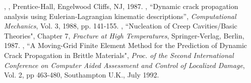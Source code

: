 \documentclass[12pt]{ksiamproc}
\begin{document}
	\begin{thebibliography}{11}
		,
		, Prentice-Hall, Engelwood Cliffs, NJ, 1987.
		,
		{``Dynamic crack propagation analysis using Eulerian-Lagrangian
			kinematic descriptions''}, {\em Computational Mechanics}, Vol. 3,
		1988, pp. 141-155.
		,
		{``Nucleation of Creep Cavities/Basic Theories"},  Chapter 7, {\it
			Fracture at High Temperatures}, Springer-Verlag, Berlin, 1987.
		,
		{``A Moving-Grid Finite Element Method for the Prediction of
			Dynamic Crack Propagation in Brittle Materials"}, {\it Proc. of
			the Second International Conference on Computer Aided Assessment
			and Control of Localized Damage}, Vol. 2, pp 463-480, Southampton
		U.K., July 1992.
	\end{thebibliography}
\end{document}
